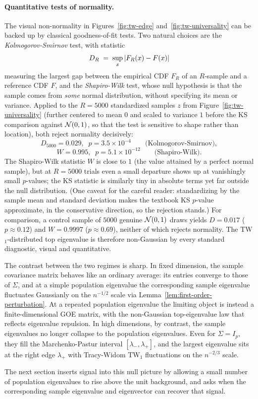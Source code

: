 \paragraph{Quantitative tests of normality.}
The visual non-normality in Figures~\ref{fig:tw-edge} and~\ref{fig:tw-universality} can be backed up by classical goodness-of-fit tests. Two natural choices are the \emph{Kolmogorov-Smirnov} test, with statistic
\[
  D_R \;=\; \sup_x \, \lvert F_R(x) - F(x)\rvert
\]
measuring the largest gap between the empirical CDF \(F_R\) of an \(R\)-sample and a reference CDF \(F\), and the \emph{Shapiro-Wilk} test, whose null hypothesis is that the sample comes from \emph{some} normal distribution, without specifying its mean or variance. Applied to the \(R = 5000\) standardized samples \(z\) from Figure~\ref{fig:tw-universality} (further centered to mean \(0\) and scaled to variance \(1\) before the KS comparison against \(\mathcal{N}(0,1)\), so that the test is sensitive to shape rather than location), both reject normality decisively:
\[
  D_{5000} = 0.029, \;\; p = 3.5 \times 10^{-4} \qquad\text{(Kolmogorov-Smirnov)},
\]
\[
  W = 0.995, \;\; p = 5.1 \times 10^{-12} \qquad\text{(Shapiro-Wilk)}.
\]
The Shapiro-Wilk statistic \(W\) is close to \(1\) (the value attained by a perfect normal sample), but at \(R = 5000\) trials even a small departure shows up at vanishingly small \(p\)-values; the KS statistic is similarly tiny in absolute terms yet far outside the null distribution. (One caveat for the careful reader: standardizing by the sample mean and standard deviation makes the textbook KS \(p\)-value approximate, in the conservative direction, so the rejection stands.) For comparison, a control sample of \(5000\) genuine \(\mathcal{N}(0, 1)\) draws yields \(D = 0.017\) (\(p \approx 0.12\)) and \(W = 0.9997\) (\(p \approx 0.69\)), neither of which rejects normality. The TW\(_1\)-distributed top eigenvalue is therefore non-Gaussian by every standard diagnostic, visual and quantitative.

The contrast between the two regimes is sharp. In fixed dimension, the sample covariance matrix behaves like an ordinary average: its entries converge to those of \(\Sigma\), and at a simple population eigenvalue the corresponding sample eigenvalue fluctuates Gaussianly on the \(n^{-1/2}\) scale via Lemma~\ref{lem:first-order-perturbation}. At a repeated population eigenvalue the limiting object is instead a finite-dimensional GOE matrix, with the non-Gaussian top-eigenvalue law that reflects eigenvalue repulsion. In high dimensions, by contrast, the sample eigenvalues no longer collapse to the population eigenvalues. Even for \(\Sigma = I_p\), they fill the Marchenko-Pastur interval \([\lambda_-, \lambda_+]\), and the largest eigenvalue sits at the right edge \(\lambda_+\) with Tracy-Widom \(\mathrm{TW}_1\) fluctuations on the \(n^{-2/3}\) scale.

The next section inserts signal into this null picture by allowing a small number of population eigenvalues to rise above the unit background, and asks when the corresponding sample eigenvalue and eigenvector can recover that signal.

\clearpage
